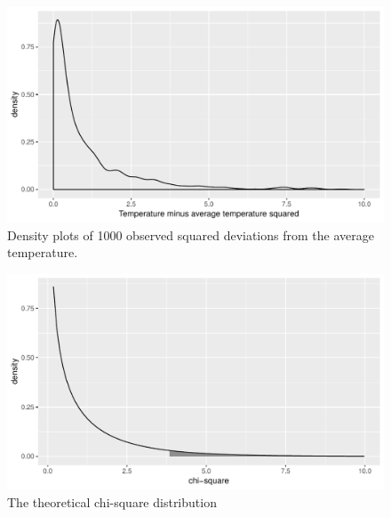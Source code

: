 \documentclass[]{report}\usepackage[]{graphicx}\usepackage[]{color}
\makeatletter
\def\maxwidth{ %
  \ifdim\Gin@nat@width>\linewidth
    \linewidth
  \else
    \Gin@nat@width
  \fi
}
\newenvironment{kframe}{%
 \def\at@end@of@kframe{}%
 \ifinner\ifhmode%
  \def\at@end@of@kframe{\end{minipage}}%
  \begin{minipage}{\columnwidth}%
 \fi\fi%
 \def\FrameCommand##1{\hskip\@totalleftmargin \hskip-\fboxsep
 \colorbox{shadecolor}{##1}\hskip-\fboxsep
     \hskip-\linewidth \hskip-\@totalleftmargin \hskip\columnwidth}%
 \MakeFramed {\advance\hsize-\width
   \@totalleftmargin\z@ \linewidth\hsize
   \@setminipage}}%
 {\par\unskip\endMakeFramed%
 \at@end@of@kframe}
\newenvironment{knitrout}{}{} %
\makeatother
\begin{document}
\begin{knitrout}
\color{fgcolor}\begin{figure}

{\centering \includegraphics[width=\maxwidth]{figure/distr_5-1} 

}

\caption[Density plots of 1000 observed squared deviations from the average temperature]{Density plots of 1000 observed squared deviations from the average temperature.}\label{fig:distr_5}
\end{figure}


\end{knitrout}

\begin{knitrout}
\color{fgcolor}\begin{figure}

{\centering \includegraphics[width=\maxwidth]{figure/distr_6-1} 

}

\caption[The theoretical chi-square distribution]{The theoretical chi-square distribution}\label{fig:distr_6}
\end{figure}

\begin{kframe}

{\ttfamily\noindent\bfseries\color{errorcolor}{\#\# Error: Cannot add ggproto objects together. Did you forget to add this object to a ggplot object?}}\end{kframe}
\end{knitrout}
\end{document}
